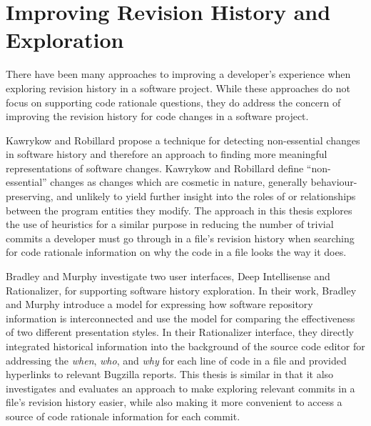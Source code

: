 \section{Improving Revision History and Exploration}

There have been many approaches to improving a developer's experience when exploring revision history in a software project. While these approaches do not focus on supporting code rationale questions, they do address the concern of improving the revision history for code changes in a software project.

Kawrykow and Robillard \cite{kawrykow_non-essential_2011} propose a technique for detecting non-essential changes in software history and therefore an approach to finding more meaningful representations of software changes.
Kawrykow and Robillard define ``non-essential'' changes as changes which are cosmetic in nature, generally behaviour-preserving, and unlikely to yield further insight into the roles of or relationships between the program entities they modify. \cite{kawrykow_non-essential_2011}
The approach in this thesis explores the use of heuristics for a similar purpose in reducing the number of trivial commits a developer must go through in a file's revision history when searching for code rationale information on why the code in a file looks the way it does.

Bradley and Murphy \cite{bradley_supporting_2011} investigate two user interfaces, Deep Intellisense and Rationalizer, for supporting software history exploration.
In their work, Bradley and Murphy introduce a model for expressing how software repository information is interconnected and use the model for comparing the effectiveness of two different presentation styles.
In their Rationalizer interface, they directly integrated historical information into the background of the source code editor for addressing the \emph{when}, \emph{who}, and \emph{why} for each line of code in a file and provided hyperlinks to relevant Bugzilla reports. \cite{bradley_supporting_2011}
This thesis is similar in that it also investigates and evaluates an approach to make exploring relevant commits in a file's revision history easier, while also making it more convenient to access a source of code rationale information for each commit.

